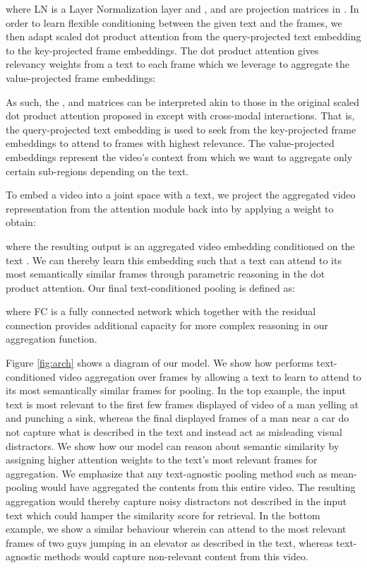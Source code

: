 \documentclass[10pt,twocolumn,letterpaper]{article}
\begin{document}
where LN is a Layer Normalization layer \cite{ba2016layer} and ,  and  are projection matrices in . In order to learn flexible conditioning between the given text and the frames, we then adapt scaled dot product attention from the query-projected text embedding to the key-projected frame embeddings. The dot product attention gives relevancy weights from a text to each frame which we leverage to aggregate the value-projected frame embeddings: 


As such, the ,  and  matrices can be interpreted akin to those in the original scaled dot product attention proposed in \cite{vaswani2017attention} except with cross-modal interactions. That is, the query-projected text embedding is used to seek from the key-projected frame embeddings to attend to frames with highest relevance. The value-projected embeddings represent the video's context from which we want to aggregate only certain sub-regions depending on the text. 

To embed a video into a joint space with a text, we project the aggregated video representation from the attention module back into  by applying a weight  to obtain:

where the resulting output   is an aggregated video embedding conditioned on the text . We can thereby learn this embedding such that a text can attend to its most semantically similar frames through parametric reasoning in the dot product attention. Our final text-conditioned pooling is defined as:

where FC is a fully connected network which together  with the residual connection provides additional capacity for more complex reasoning in our aggregation function.

Figure \ref{fig:arch} shows a diagram of our model. We show how \ModelName{} performs text-conditioned video aggregation over frames by allowing a text to learn to attend to its most semantically similar frames for pooling. In the top example, the input text  is most relevant to the first few frames displayed of video  of a man yelling at and punching a sink, whereas the final displayed frames of a man near a car do not capture what is described in the text and instead act as misleading visual distractors. We show how our model can reason about semantic similarity by assigning higher attention weights to the text's most relevant frames for aggregation. We emphasize that any text-agnostic pooling method such as mean-pooling would have aggregated the contents from this entire video. The resulting aggregation would thereby capture noisy distractors not described in the input text which could hamper the similarity score for retrieval. In the bottom example, we show a similar behaviour wherein \ModelName{} can attend to the most relevant frames of two guys jumping in an elevator as described in the text, whereas text-agnostic methods would capture non-relevant content from this video.   
\end{document}
